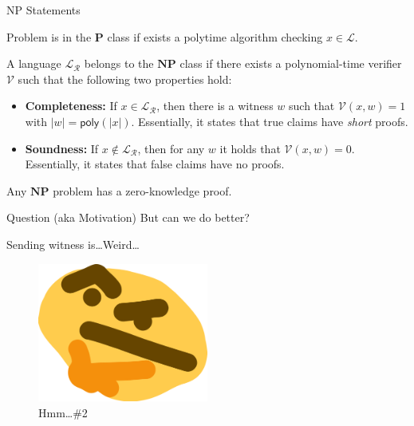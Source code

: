 \documentclass[xcolor={usenames,dvipsnames}]{beamer}
\begin{document}
    \begin{frame}{NP Statements}
        \begin{definition}[P Language]
            Problem is in the $\mathbf{P}$ class if exists a polytime algorithm checking $x \in \mathcal{L}$.
        \end{definition}

        \begin{definition}[NP Language]
            A language $\mathcal{L}_{\mathcal{R}}$ belongs to the $\mathbf{NP}$ class if there exists a polynomial-time verifier $\mathcal{V}$ such that the following two properties hold:
            \begin{itemize}
                \item \textbf{Completeness:} If $x \in \mathcal{L}_{\mathcal{R}}$, then there is a witness $w$ such that $\mathcal{V}(x, w) = 1$ with $|w| = \mathsf{poly}(|x|)$. Essentially, it states that true claims have \textit{short} proofs.
                \item \textbf{Soundness:} If $x \not\in \mathcal{L}_{\mathcal{R}}$, then for any $w$ it holds that $\mathcal{V}(x, w) = 0$. Essentially, it states that false claims have no proofs.
            \end{itemize}
        \end{definition}

        \begin{theorem}
            Any $\mathbf{NP}$ problem has a zero-knowledge proof.
        \end{theorem}
    \end{frame}

    \begin{frame}{Question (aka Motivation)}
        But can we do better?

        Sending witness is\ldots Weird\ldots

        \begin{figure}
            \centering
            \includegraphics[width=0.5\textwidth]{images/lecture_6/thonk.png}
            \caption{Hmm\ldots \#2}
        \end{figure}
    \end{frame}
\end{document}
